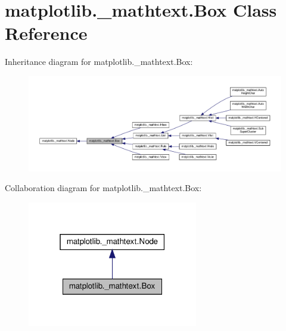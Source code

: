 \hypertarget{classmatplotlib_1_1__mathtext_1_1Box}{}\section{matplotlib.\+\_\+mathtext.\+Box Class Reference}
\label{classmatplotlib_1_1__mathtext_1_1Box}


Inheritance diagram for matplotlib.\+\_\+mathtext.\+Box\+:
\nopagebreak
\begin{figure}[H]
\begin{center}
\leavevmode
\includegraphics[width=350pt]{classmatplotlib_1_1__mathtext_1_1Box__inherit__graph}
\end{center}
\end{figure}


Collaboration diagram for matplotlib.\+\_\+mathtext.\+Box\+:
\nopagebreak
\begin{figure}[H]
\begin{center}
\leavevmode
\includegraphics[width=211pt]{classmatplotlib_1_1__mathtext_1_1Box__coll__graph}
\end{center}
\end{figure}
